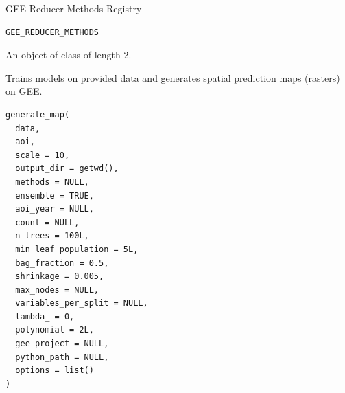 \documentclass[letterpaper]{book}
\begin{document}
%
\begin{Description}
GEE Reducer Methods Registry
\end{Description}
%
\begin{Usage}
\begin{verbatim}
GEE_REDUCER_METHODS
\end{verbatim}
\end{Usage}
%
\begin{Format}
An object of class  of length 2.
\end{Format}
%
\begin{Description}
Trains models on provided data and generates spatial prediction maps (rasters) on GEE.
\end{Description}
%
\begin{Usage}
\begin{verbatim}
generate_map(
  data,
  aoi,
  scale = 10,
  output_dir = getwd(),
  methods = NULL,
  ensemble = TRUE,
  aoi_year = NULL,
  count = NULL,
  n_trees = 100L,
  min_leaf_population = 5L,
  bag_fraction = 0.5,
  shrinkage = 0.005,
  max_nodes = NULL,
  variables_per_split = NULL,
  lambda_ = 0,
  polynomial = 2L,
  gee_project = NULL,
  python_path = NULL,
  options = list()
)
\end{verbatim}
\end{Usage}
%
\end{document}
